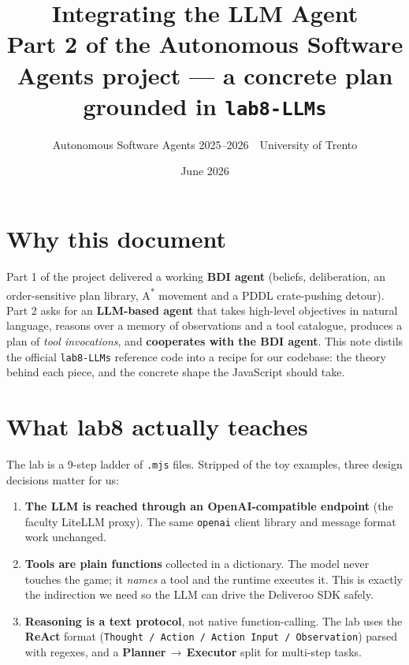 \documentclass[11pt,a4paper]{article}
\title{\vspace{-1.2cm}\textbf{\color{accent}Integrating the LLM Agent}\\[2pt]
\large Part 2 of the Autonomous Software Agents project --- a concrete plan grounded in \texttt{lab8-LLMs}}
\author{Autonomous Software Agents 2025--2026 \,\textbar\, University of Trento}
\date{June 2026}
\begin{document}
\maketitle
\vspace{-0.7cm}

\section{Why this document}
Part 1 of the project delivered a working \textbf{BDI agent} (beliefs, deliberation, an
order-sensitive plan library, A\textsuperscript{*} movement and a PDDL crate-pushing detour).
Part 2 asks for an \textbf{LLM-based agent} that takes high-level objectives in natural
language, reasons over a memory of observations and a tool catalogue, produces a plan of
\emph{tool invocations}, and \textbf{cooperates with the BDI agent}. This note distils the
official \texttt{lab8-LLMs} reference code into a recipe for our codebase: the theory behind
each piece, and the concrete shape the JavaScript should take.

\section{What lab8 actually teaches}
The lab is a 9-step ladder of \texttt{.mjs} files. Stripped of the toy examples, three design
decisions matter for us:

\begin{enumerate}
  \item \textbf{The LLM is reached through an OpenAI-compatible endpoint} (the faculty
  LiteLLM proxy). The same \texttt{openai} client library and message format work unchanged.
  \item \textbf{Tools are plain functions} collected in a dictionary. The model never touches
  the game; it \emph{names} a tool and the runtime executes it. This is exactly the indirection
  we need so the LLM can drive the Deliveroo SDK safely.
  \item \textbf{Reasoning is a text protocol}, not native function-calling. The lab uses the
  \textbf{ReAct} format (\texttt{Thought / Action / Action Input / Observation}) parsed with
  regexes, and a \textbf{Planner\,$\rightarrow$\,Executor} split for multi-step tasks.
\end{enumerate}
\end{document}
